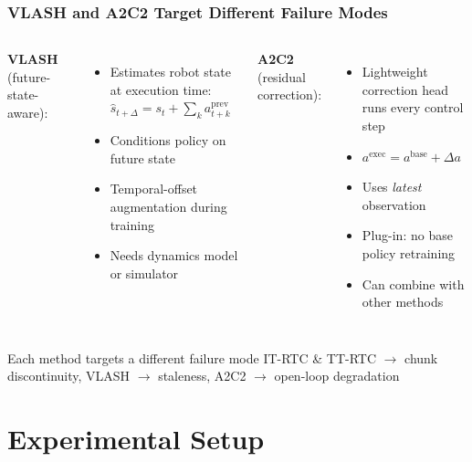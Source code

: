 \documentclass[aspectratio=1610]{beamer}
\begin{document}
\begin{frame}
\frametitle{VLASH and A2C2 Target Different Failure Modes}

\begin{columns}
\textbf{VLASH} (future-state-aware):
\begin{itemize}
    \item Estimates robot state at execution time:
    $\hat{s}_{t+\Delta} = s_t + \sum_k a_{t+k}^{\text{prev}}$
    \item Conditions policy on future state
    \item Temporal-offset augmentation during training
    \item Needs dynamics model or simulator
\end{itemize}

\textbf{A2C2} (residual correction):
\begin{itemize}
    \item Lightweight correction head runs every control step
    \item $a^{\text{exec}} = a^{\text{base}} + \Delta a$
    \item Uses \emph{latest} observation
    \item \alert{Plug-in:} no base policy retraining
    \item Can combine with other methods
\end{itemize}
\end{columns}

\vspace{0.5em}
\begin{block}{Each method targets a different failure mode}
IT-RTC \& TT-RTC $\rightarrow$ chunk discontinuity, \quad VLASH $\rightarrow$ staleness, \quad A2C2 $\rightarrow$ open-loop degradation
\end{block}

\end{frame}

\section{Experimental Setup}
\end{document}
